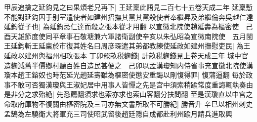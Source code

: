 甲辰追擒之延鈞見之曰果煩老兄再下|{
	王延稟此語見二百七十五卷天成二年}
延稟慙不能對延鈞囚于别室遣使者如建州招撫其黨其黨殺使者奉繼昇及弟繼倫奔吳越仁達延鈞從子也|{
	為延鈞忌仁達而殺之張本從才用翻}
以宣徽北院使趙延壽為樞密使　己酉天雄節度使同平章事石敬瑭兼六軍諸衛副使辛亥以朱弘昭為宣徽南院使　五月閩王延鈞斬王延稟於市復其姓名曰周彦琛遣其弟都教練使延政如建州撫慰吏民|{
	為王延政以建州與福州相攻張本}
丁卯罷畝税麴錢|{
	計畝税麴錢見上卷天成三年}
城中官造麴減舊半價鄉村聽百姓自造民甚便之　己卯以孟漢瓊知内侍省事充宣徽北院使漢瓊本趙王鎔奴也時范延光趙延壽雖為樞密使懲安重誨以剛愎得罪|{
	愎蒲逼翻}
每於政事不敢可否獨漢瓊與王淑妃居中用事人皆憚之先是宫中須索稍踰常度重誨輒執奏由是非分之求殆絶|{
	先悉薦翻須求也索亦求也索山客翻分扶問翻}
至是漢瓊直以中宫之命取府庫物不復關由樞密院及三司亦無文書所取不可勝紀|{
	勝音升}
辛巳以相州刺史孟鵠為左驍衛大將軍充三司使昭武留後趙廷隱自成都赴利州踰月請兵進取興

